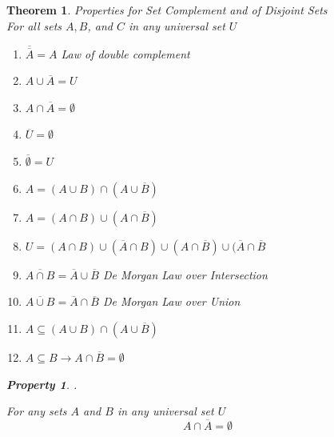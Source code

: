 \documentclass{book}
\newtheorem{theorem}{Theorem}[section]
\newtheorem{property}{Property}[theorem]
\theoremstyle{definition}
\theoremstyle{remark}
\begin{document}
\newpage
\begin{theorem}
Properties for Set Complement and of Disjoint Sets \\

For all sets $A, B$, and $C$ in any universal set $U$ \\

    \begin{enumerate}
        \item $\overline{\overline{A}} = A$ \textit{Law of double complement}
        
        \item $A \cup \overline{A} = U$
        
        \item $A \cap \overline{A} = \emptyset$
        
        \item $\overline{U} = \emptyset$
        
        \item $\overline{\emptyset} = U$ 
        
        \item $A = (A \cup B) \cap (A \cup \overline{B})$
        
        \item $A = (A \cap B) \cup (A \cap \overline{B})$
        
        \item $U = (A \cap B) \cup (\overline{A} \cap B) \cup (A \cap \overline{B}) \cup (\overline{A} \cap \overline{B}$
        
        \item $\overline{A \cap B} = \overline{A} \cup \overline{B}$ \textit{De Morgan Law over Intersection}
        
        \item $\overline{A \cup B} = \overline{A} \cap \overline{B}$ \textit{De Morgan Law over Union}
        
        \item $A \subseteq (A \cup B) \cap (A \cup \overline{B})$ %
        
        \item $A \subseteq B \to A \cap \overline{B} = \emptyset$
    \end{enumerate}



    \newpage
    \begin{property}
    . \\
        \begin{tcolorbox}
            For any sets $A$ and $B$ in any universal set $U$
                \begin{equation*}
                    A \cap \overline{A} = \emptyset
                \end{equation*}
        \end{tcolorbox}
    

\end{property}
\end{theorem}
\end{document}
